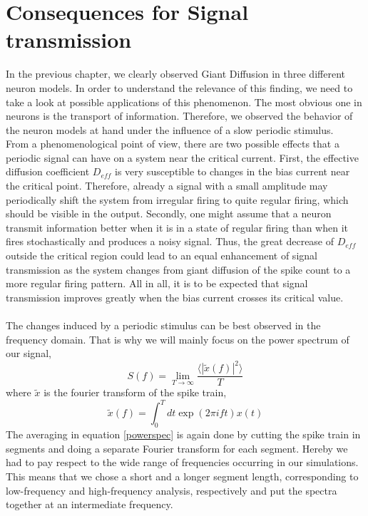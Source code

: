 \documentclass[12pt,a4paper]{article}
\begin{document}
\section{Consequences for Signal transmission}
In the previous chapter, we clearly observed Giant Diffusion in three different neuron models. In order to understand the relevance of this finding, we need to take a look at possible applications of this phenomenon. The most obvious one in neurons is the transport of information. Therefore, we observed the behavior of the neuron models at hand under the influence of a slow periodic stimulus.
\\
From a phenomenological point of view, there are two possible effects that a periodic signal can have on a system near the critical current. First, the effective diffusion coefficient $D_{eff}$ is very susceptible to changes in the bias current near the critical point. Therefore, already a signal with a small amplitude may periodically shift the system from irregular firing to quite regular firing, which should be visible in the output.
Secondly, one might assume that a neuron transmit information better when it is in a state of regular firing than when it fires stochastically and produces a noisy signal. Thus, the great decrease of $D_{eff}$ outside the critical region could lead to an equal enhancement of signal transmission as the system changes from giant diffusion of the spike count to a more regular firing pattern.
All in all, it is to be expected that signal transmission improves greatly when the bias current crosses its critical value.\\\\
The changes induced by a periodic stimulus can be best observed in the frequency domain. That is why we will mainly focus on the power spectrum of our signal,
\begin{equation}\label{powerspec}
S(f)=\lim_{T\rightarrow\infty}\frac{\langle|\tilde{x}(f)|^2\rangle}{T}
\end{equation}
where $\tilde{x}$ is the fourier transform of the spike train,
\begin{equation}
\tilde{x}(f)=\int_{0}^{T}dt \exp(2\pi ift)x(t)
\end{equation}
The averaging in equation \ref{powerspec} is again done by cutting the spike train in segments and doing a separate Fourier transform for each segment. Hereby we had to pay respect to the wide range of frequencies occurring in our simulations. This means that we chose a short and a longer segment length, corresponding to low-frequency and high-frequency analysis, respectively and put the spectra together at an intermediate frequency.
\end{document}
